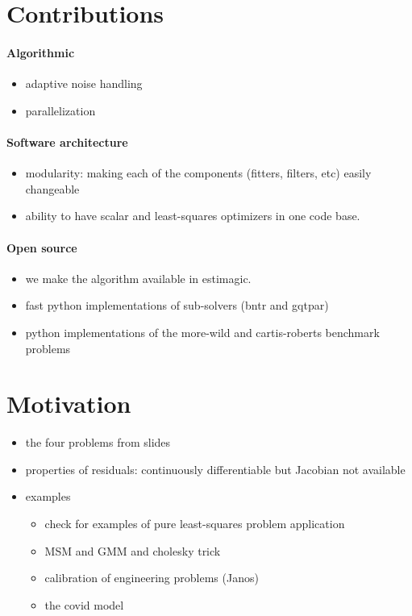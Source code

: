 \section{Contributions}
\paragraph{Algorithmic}
\begin{itemize}
    \item adaptive noise handling
    \item parallelization
\end{itemize}
\paragraph{Software architecture}
\begin{itemize}
    \item modularity: making each of the components (fitters, filters, etc) easily changeable
    \item ability to have scalar and least-squares optimizers in one code base.
\end{itemize}
\paragraph{Open source}
\begin{itemize}
    \item we make the algorithm available in estimagic.
    \item fast python implementations of sub-solvers (bntr and gqtpar)
    \item python implementations of the  more-wild and cartis-roberts benchmark problems
\end{itemize}

\section{Motivation}

\begin{itemize}
    \item the four problems from slides
    \item properties of residuals: continuously differentiable but Jacobian not available
    \item examples
        \begin{itemize}
            \item check for examples of pure least-squares problem application
            \item MSM and GMM and cholesky trick
            \item calibration of engineering problems (Janos)
            \item the covid model
        \end{itemize}
\end{itemize}

